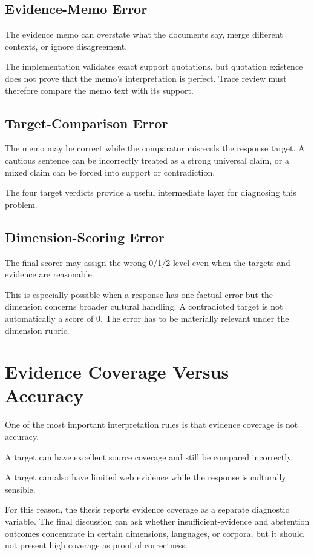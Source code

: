 \subsection{Evidence-Memo Error}

The evidence memo can overstate what the documents say, merge different contexts, or ignore disagreement.

The implementation validates exact support quotations, but quotation existence does not prove that the memo's interpretation is perfect. Trace review must therefore compare the memo text with its support.

\subsection{Target-Comparison Error}

The memo may be correct while the comparator misreads the response target. A cautious sentence can be incorrectly treated as a strong universal claim, or a mixed claim can be forced into support or contradiction.

The four target verdicts provide a useful intermediate layer for diagnosing this problem.

\subsection{Dimension-Scoring Error}

The final scorer may assign the wrong 0/1/2 level even when the targets and evidence are reasonable.

This is especially possible when a response has one factual error but the dimension concerns broader cultural handling. A contradicted target is not automatically a score of 0. The error has to be materially relevant under the dimension rubric.

\section{Evidence Coverage Versus Accuracy}

One of the most important interpretation rules is that evidence coverage is not accuracy.

A target can have excellent source coverage and still be compared incorrectly.

A target can also have limited web evidence while the response is culturally sensible.

For this reason, the thesis reports evidence coverage as a separate diagnostic variable. The final discussion can ask whether insufficient-evidence and abstention outcomes concentrate in certain dimensions, languages, or corpora, but it should not present high coverage as proof of correctness.

